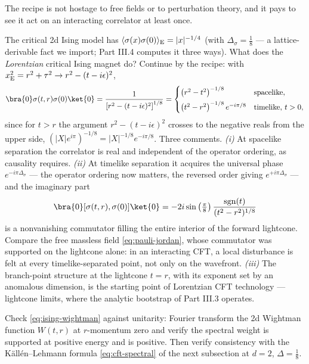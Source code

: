 The recipe is not hostage to free fields or to perturbation theory, and it
pays to see it act on an interacting correlator at least once.

\begin{eexample}
\label{ex:ising-lorentzian}
The critical 2d Ising model has $\langle\sigma(x)\sigma(0)\rangle_{\rm E} =
|x|^{-1/4}$ (with $\Delta_\sigma = \tfrac18$ --- a lattice-derivable fact we
import; Part III.4 computes it three ways). What does the \emph{Lorentzian}
critical Ising magnet do? Continue by the recipe: with $x^2_{\rm E} = r^2 +
\tau^2 \to r^2 - (t - i\epsilon)^2$,
\begin{equation}
\bra{0}\sigma(t, r)\sigma(0)\ket{0}
= \frac{1}{\left[r^2 - (t - i\epsilon)^2\right]^{1/8}}
= \begin{cases}
\left(r^2 - t^2\right)^{-1/8} & \text{spacelike}, \\[4pt]
\left(t^2 - r^2\right)^{-1/8} e^{-i\pi/8} & \text{timelike, } t > 0,
\end{cases}
\label{eq:ising-wightman}
\end{equation}
since for $t > r$ the argument $r^2 - (t-i\epsilon)^2$ crosses to the
negative reals from the upper side, $(|X| e^{i\pi})^{-1/8} = |X|^{-1/8}
e^{-i\pi/8}$. Three comments. \emph{(i)} At spacelike separation the
correlator is real and independent of the operator ordering, as causality
requires. \emph{(ii)} At
timelike separation it acquires the universal phase $e^{-i\pi \Delta_\sigma}$
--- the operator ordering now matters, the reversed order giving
$e^{+i\pi\Delta_\sigma}$ --- and the imaginary part
\begin{equation}
\bra{0}[\sigma(t,r), \sigma(0)]\ket{0}
= -2i\sin\left(\tfrac{\pi}{8}\right)
\frac{\mathrm{sgn}(t)}{(t^2 - r^2)^{1/8}}
\end{equation}
is a nonvanishing commutator filling the entire interior of the forward
lightcone. Compare the free massless field \eqref{eq:pauli-jordan}, whose
commutator was supported on the lightcone alone: in an interacting CFT, a
local disturbance is felt at every timelike-separated point, not only on the
wavefront. \emph{(iii)} The branch-point structure at the lightcone $t = r$,
with its exponent set by an anomalous dimension, is the starting point of
Lorentzian CFT technology --- lightcone limits, where the analytic bootstrap
of Part III.3 operates.
\end{eexample}

\begin{exercise}[medium]
\label{exr:ising-spectral}
Check \eqref{eq:ising-wightman} against unitarity: Fourier transform the 2d
Wightman function $W(t, r)$ at $r$-momentum zero and verify the spectral
weight is supported at positive energy and is positive. Then verify
consistency with the K\"all\'en--Lehmann formula \eqref{eq:cft-spectral} of
the next subsection at $d = 2$, $\Delta = \frac18$.
\end{exercise}

